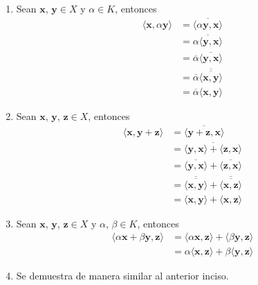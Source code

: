 \begin{prop}{}{}
    \tcblower
    \demostracion
    \begin{enumerate}[label=\roman*), topsep=6pt, itemsep=0pt]
        \item Sean $\mathbf{x}$, $\mathbf{y} \in X$ y $\alpha \in K$, entonces
        \begin{align*}
            \langle \mathbf{x}, \alpha \mathbf{y} \rangle & = \overline{\langle \alpha \mathbf{y}, \mathbf{x} \rangle} \\
            & = \overline{\alpha \langle \mathbf{y}, \mathbf{x} \rangle} \\
            & = \overline{\alpha} \overline{\langle \mathbf{y}, \mathbf{x} \rangle} \\
            & = \overline{\alpha} \overline{\overline{\langle \mathbf{x}, \mathbf{y} \rangle}} \\
            & = \overline{\alpha} \langle \mathbf{x}, \mathbf{y} \rangle
        \end{align*}
        \item Sean $\mathbf{x}$, $\mathbf{y}$, $\mathbf{z} \in X$, entonces
        \begin{align*}
            \langle \mathbf{x}, \mathbf{y} + \mathbf{z} \rangle & = \overline{\langle \mathbf{y} + \mathbf{z}, \mathbf{x} \rangle} \\
            & = \overline{\langle \mathbf{y}, \mathbf{x} \rangle + \langle \mathbf{z}, \mathbf{x} \rangle} \\
            & = \overline{\langle \mathbf{y}, \mathbf{x} \rangle} + \overline{\langle \mathbf{z}, \mathbf{x} \rangle} \\
            & = \overline{\overline{\langle \mathbf{x}, \mathbf{y} \rangle}} + \overline{\overline{\langle \mathbf{x}, \mathbf{z} \rangle}} \\
            & = \langle \mathbf{x}, \mathbf{y} \rangle + \langle \mathbf{x}, \mathbf{z} \rangle
        \end{align*}
        \item Sean $\mathbf{x}$, $\mathbf{y}$, $\mathbf{z} \in X$ y $\alpha$, $\beta \in K$, entonces
        \begin{align*}
            \langle \alpha \mathbf{x} + \beta \mathbf{y}, \mathbf{z} \rangle & = \langle \alpha \mathbf{x}, \mathbf{z} \rangle + \langle \beta \mathbf{y}, \mathbf{z} \rangle \\
            & = \alpha \langle \mathbf{x}, \mathbf{z} \rangle + \beta \langle \mathbf{y}, \mathbf{z} \rangle
        \end{align*}
        \item Se demuestra de manera similar al anterior inciso.
    \end{enumerate}
\end{prop}